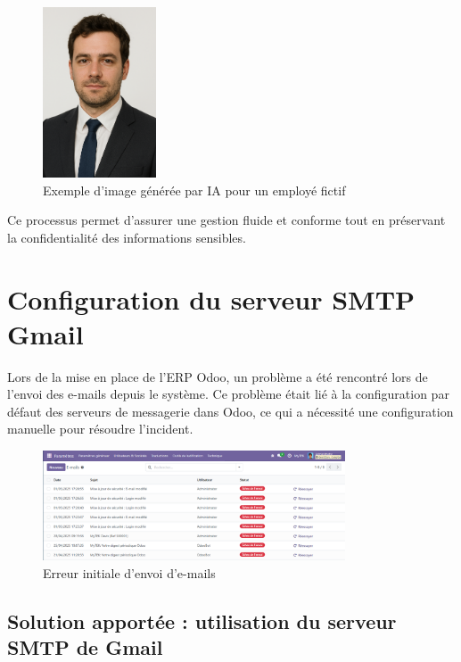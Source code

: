 \documentclass[12pt]{report}
\begin{document}
\begin{figure}[H]
\centering
\includegraphics[width=0.3\textwidth]{images/chatGPTEmployee.png}
\caption{Exemple d’image générée par IA pour un employé fictif}
\end{figure}

Ce processus permet d'assurer une gestion fluide et conforme tout en préservant la confidentialité des informations sensibles.



\section{Configuration du serveur SMTP Gmail}

Lors de la mise en place de l'ERP Odoo, un problème a été rencontré lors de l’envoi des e-mails depuis le système. Ce problème était lié à la configuration par défaut des serveurs de messagerie dans Odoo, ce qui a nécessité une configuration manuelle pour résoudre l'incident.

\begin{figure}[H]
\centering
\includegraphics[width=0.8\textwidth]{images/email_ne_fonctionne_pas.PNG}
\caption{Erreur initiale d'envoi d'e-mails}
\end{figure}

\subsection{Solution apportée : utilisation du serveur SMTP de Gmail}
\end{document}
